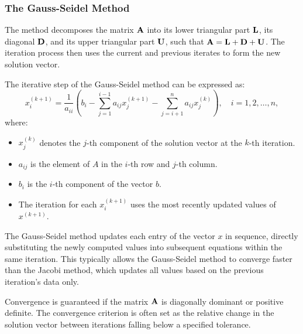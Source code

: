 \subsubsection*{The Gauss-Seidel Method}

The method decomposes the matrix $\mathbf{A}$ into its lower triangular part $\mathbf{L}$, its diagonal $\mathbf{D}$, and its upper triangular part $\mathbf{U}$, 
such that $\mathbf{A} = \mathbf{L} + \mathbf{D} + \mathbf{U}$. The iteration process then uses the current and previous iterates to form the new solution vector.

The iterative step of the Gauss-Seidel method can be expressed as:
\begin{equation*}
    x^{(k+1)}_i = \frac{1}{a_{ii}}\left(b_i - \sum_{j=1}^{i-1} a_{ij} x^{(k+1)}_j - \sum_{j=i+1}^n a_{ij} x^{(k)}_j \right), \quad i = 1, 2, \ldots, n,
\end{equation*}
where:
\begin{itemize}
    \item $x^{(k)}_j$ denotes the $j$-th component of the solution vector at the $k$-th iteration.
    \item $a_{ij}$ is the element of $A$ in the $i$-th row and $j$-th column.
    \item $b_i$ is the $i$-th component of the vector $b$.
    \item The iteration for each $x^{(k+1)}_i$ uses the most recently updated values of $x^{(k+1)}$.
\end{itemize}

The Gauss-Seidel method updates each entry of the vector $x$ in sequence, directly substituting the newly computed values into subsequent equations within the same iteration. This typically allows the Gauss-Seidel method to converge faster than the Jacobi method, which updates all values based on the previous iteration's data only.

Convergence is guaranteed if the matrix $\mathbf{A}$ is diagonally dominant or positive definite. 
The convergence criterion is often set as the relative change in the solution vector between iterations falling below a specified tolerance.

